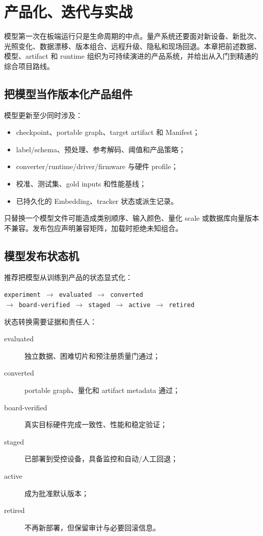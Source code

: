 \chapter{产品化、迭代与实战}
\label{chap:edge-ai-product-lifecycle-projects}

模型第一次在板端运行只是生命周期的中点。量产系统还要面对新设备、新批次、光照变化、数据漂移、版本组合、远程升级、隐私和现场回退。本章把前述数据、模型、artifact 和 runtime 组织为可持续演进的产品系统，并给出从入门到精通的综合项目路线。

\section{把模型当作版本化产品组件}

模型更新至少同时涉及：

\begin{itemize}
  \item checkpoint、portable graph、target artifact 和 Manifest；
  \item label/schema、预处理、参考解码、阈值和产品策略；
  \item converter/runtime/driver/firmware 与硬件 profile；
  \item 校准、测试集、gold inputs 和性能基线；
  \item 已持久化的 Embedding、tracker 状态或派生记录。
\end{itemize}

只替换一个模型文件可能造成类别顺序、输入颜色、量化 scale 或数据库向量版本不兼容。发布包应声明兼容矩阵，加载时拒绝未知组合。

\section{模型发布状态机}

推荐把模型从训练到产品的状态显式化：

\begin{center}
\texttt{experiment $\rightarrow$ evaluated $\rightarrow$ converted}
\\
\texttt{$\rightarrow$ board-verified $\rightarrow$ staged $\rightarrow$ active $\rightarrow$ retired}
\end{center}

状态转换需要证据和责任人：

\begin{description}
  \item[evaluated] 独立数据、困难切片和预注册质量门通过；
  \item[converted] portable graph、量化和 artifact metadata 通过；
  \item[board-verified] 真实目标硬件完成一致性、性能和稳定验证；
  \item[staged] 已部署到受控设备，具备监控和自动/人工回退；
  \item[active] 成为批准默认版本；
  \item[retired] 不再新部署，但保留审计与必要回滚信息。
\end{description}

